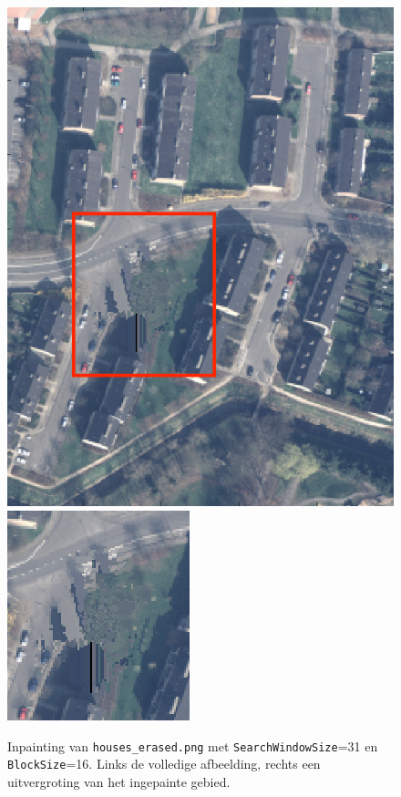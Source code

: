 \documentclass[titlepage]{article}
\begin{document}
\begin{figure}[!ht]
    \centering
    \captionsetup{justification=centering}
    \includegraphics[width=.4\textwidth]{houses_erased_31_16}
    \quad
    \includegraphics[width=.4\textwidth]{houses_erased_31_16_zoomed}
    \caption{Inpainting van \texttt{houses\_erased.png} met \texttt{SearchWindowSize}=31 en \texttt{BlockSize}=16. Links de volledige afbeelding, rechts een uitvergroting van het ingepainte gebied.} 
    \label{fig:houses_erased}
\end{figure}
\end{document}
